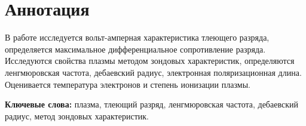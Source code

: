 \section*{Аннотация}

В работе исследуется вольт-амперная характеристика тлеющего разряда, определяется максимальное дифференциальное сопротивление разряда. Исследуются свойства плазмы методом зондовых характеристик, определяются ленгмюровская частота, дебаевский радиус, электронная поляризационная длина. Оценивается температура электронов и степень ионизации плазмы.

\textbf{Ключевые слова:} плазма, тлеющий разряд, ленгмюровская частота, дебаевский радиус, метод зондовых характеристик.